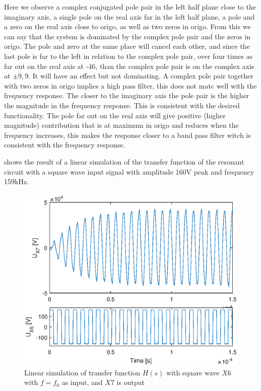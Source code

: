 Here we observe a complex conjugated pole pair in the left half plane close to the imaginary axis, a single pole on the real axis far in the left half plane, a pole and a zero on the real axis close to origo, as well as two zeros in origo. From this we can say that the system is dominated by the complex pole pair and the zeros in origo. The pole and zero at the same place will cancel each other, and since the last pole is far to the left in relation to the complex pole pair, over four times as far out on the real axis at -46, than the complex pole pair is on the complex axis at $\pm 9,9$. It will have an effect but not dominating. A complex pole pair together with two zeros in origo implies a high pass filter, this does not matc well with the frequency response. The closer to the imaginary axis the pole pair is the higher the magnitude in the frequency response. This is consistent with the desired functionality. The pole far out on the real axis will give positive (higher magnitude) contribution that is at maximum in origo and reduces when the frequency increases, this makes the response closer to a band pass filter witch is consistent with the frequency response.

 shows the result of a linear simulation of the transfer function of the resonant circuit with a square wave input signal with amplitude 160V peak and frequency 159kHz.

\begin{figure}[H]
    \centering
    \includegraphics[width=\textwidth]{img/CoilRigSimulation.eps}
    \caption{Linear simulation of transfer function $H(s)$ with square wave $X6$ with $f=f_0$ as input, and $X7$ is output}
    \label{fig:crlinsim}
\end{figure}


